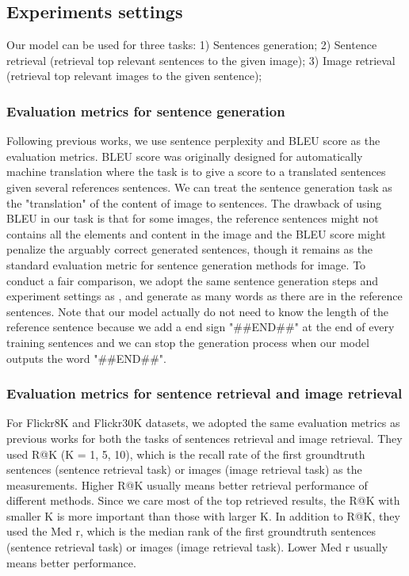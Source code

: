 \subsection{Experiments settings}

Our model can be used for three tasks: 1) Sentences generation; 2) Sentence retrieval (retrieval top relevant sentences to the given image); 3) Image retrieval (retrieval top relevant images to the given sentence);

\subsubsection{Evaluation metrics for sentence generation}
Following previous works, we use sentence perplexity and BLEU score \cite{papineni2002bleu,lin2004automatic} as the evaluation metrics.
BLEU score was originally designed for automatically machine translation where the task is to give a score to a translated sentences given several references sentences.
We can treat the sentence generation task as the "translation" of the content of image to sentences.
The drawback of using BLEU in our task is that for some images, the reference sentences might not contains all the elements and content in the image and the BLEU score might penalize the arguably correct generated sentences, though it remains as the standard evaluation metric for sentence generation methods for image.
To conduct a fair comparison, we adopt the same sentence generation steps and experiment settings as \cite{kiros2013multimodal}, and generate as many words as there are in the reference sentences.
Note that our model actually do not need to know the length of the reference sentence because we add a end sign "\#\#END\#\#" at the end of every training sentences and we can stop the generation process when our model outputs the word "\#\#END\#\#".

\subsubsection{Evaluation metrics for sentence retrieval and image retrieval}
\label{sec:EvaRet}
For Flickr8K and Flickr30K datasets, we adopted the same evaluation metrics as previous works \cite{socher2014grounded,frome2013devise,karpathy2014fragment} for both the tasks of sentences retrieval and image retrieval.
They used R@K (K = 1, 5, 10), which is the recall rate of the first groundtruth sentences (sentence retrieval task) or images (image retrieval task) as the measurements.
Higher R@K usually means better retrieval performance of different methods.
Since we care most of the top retrieved results, the R@K with smaller K is more important than those with larger K.
In addition to R@K, they used the Med r, which is the median rank of the first groundtruth sentences (sentence retrieval task) or images (image retrieval task).
Lower Med r usually means better performance.

